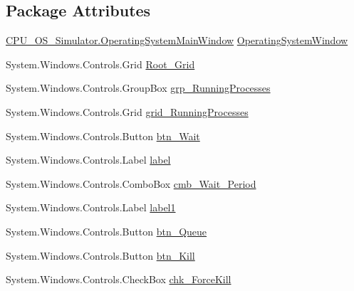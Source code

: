 \subsection*{Package Attributes}
\begin{DoxyCompactItemize}
\item 
\hyperlink{class_c_p_u___o_s___simulator_1_1_operating_system_main_window}{C\+P\+U\+\_\+\+O\+S\+\_\+\+Simulator.\+Operating\+System\+Main\+Window} \hyperlink{class_c_p_u___o_s___simulator_1_1_operating_system_main_window_ad42ee30cd6108b34ac88e9721db11b75}{Operating\+System\+Window}
\item 
System.\+Windows.\+Controls.\+Grid \hyperlink{class_c_p_u___o_s___simulator_1_1_operating_system_main_window_aaa4cd76a5ec5398ec2feacccbe5208b4}{Root\+\_\+\+Grid}
\item 
System.\+Windows.\+Controls.\+Group\+Box \hyperlink{class_c_p_u___o_s___simulator_1_1_operating_system_main_window_a07edb0a4de990e8120b24421e66f44ec}{grp\+\_\+\+Running\+Processes}
\item 
System.\+Windows.\+Controls.\+Grid \hyperlink{class_c_p_u___o_s___simulator_1_1_operating_system_main_window_a628b5d00213f20c361f776b85b3f7115}{grid\+\_\+\+Running\+Processes}
\item 
System.\+Windows.\+Controls.\+Button \hyperlink{class_c_p_u___o_s___simulator_1_1_operating_system_main_window_a3026145dbda6d838d6d542ff560c76af}{btn\+\_\+\+Wait}
\item 
System.\+Windows.\+Controls.\+Label \hyperlink{class_c_p_u___o_s___simulator_1_1_operating_system_main_window_a900faf1e6edab278754c736ccbf0f1df}{label}
\item 
System.\+Windows.\+Controls.\+Combo\+Box \hyperlink{class_c_p_u___o_s___simulator_1_1_operating_system_main_window_a4da0c086d71c3b794c9cd816aafeac88}{cmb\+\_\+\+Wait\+\_\+\+Period}
\item 
System.\+Windows.\+Controls.\+Label \hyperlink{class_c_p_u___o_s___simulator_1_1_operating_system_main_window_a4a8e9f811e590b3af2e2391740077937}{label1}
\item 
System.\+Windows.\+Controls.\+Button \hyperlink{class_c_p_u___o_s___simulator_1_1_operating_system_main_window_a241f1be0b04ce501c83e182629a6c694}{btn\+\_\+\+Queue}
\item 
System.\+Windows.\+Controls.\+Button \hyperlink{class_c_p_u___o_s___simulator_1_1_operating_system_main_window_a2620163d6bdb8e06f63a7b8027628bc3}{btn\+\_\+\+Kill}
\item 
System.\+Windows.\+Controls.\+Check\+Box \hyperlink{class_c_p_u___o_s___simulator_1_1_operating_system_main_window_a3dea755536813ea2df09cfae7d946139}{chk\+\_\+\+Force\+Kill}

\end{DoxyCompactItemize}
